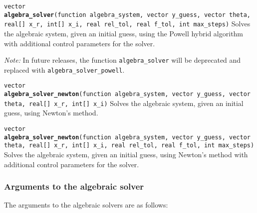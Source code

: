 \documentclass[
  10pt,
]{book}
\begin{document}

\texttt{vector} \textbf{\texttt{algebra\_solver}}\texttt{(function\ algebra\_system,\ vector\ y\_guess,\ vector\ theta,\ real{[}{]}\ x\_r,\ int{[}{]}\ x\_i,\ real\ rel\_tol,\ real\ f\_tol,\ int\ max\_steps)}\newline
Solves the algebraic system, given an initial guess, using the Powell
hybrid algorithm with additional control parameters for the solver.

\emph{Note:} In future releases, the function \texttt{algebra\_solver} will be deprecated
and replaced with \texttt{algebra\_solver\_powell}.


\texttt{vector} \textbf{\texttt{algebra\_solver\_newton}}\texttt{(function\ algebra\_system,\ vector\ y\_guess,\ vector\ theta,\ real{[}{]}\ x\_r,\ int{[}{]}\ x\_i)}\newline
Solves the algebraic system, given an initial guess, using Newton's method.


\texttt{vector} \textbf{\texttt{algebra\_solver\_newton}}\texttt{(function\ algebra\_system,\ vector\ y\_guess,\ vector\ theta,\ real{[}{]}\ x\_r,\ int{[}{]}\ x\_i,\ real\ rel\_tol,\ real\ f\_tol,\ int\ max\_steps)}\newline
Solves the algebraic system, given an initial guess, using Newton's method
with additional control parameters for the solver.

\hypertarget{arguments-to-the-algebraic-solver}{%
\subsubsection{Arguments to the algebraic solver}\label{arguments-to-the-algebraic-solver}}

The arguments to the algebraic solvers are as follows:
\end{document}
